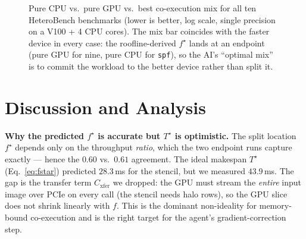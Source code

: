 \documentclass[conference]{IEEEtran}
\begin{document}
\begin{figure}[t]
\centering
{}
\caption{Pure CPU vs.\ pure GPU vs.\ best co-execution mix for all ten HeteroBench
benchmarks (lower is better, log scale, single precision on a V100 + 4 CPU cores). The
mix bar coincides with the faster device in every case: the roofline-derived $f^\star$
lands at an endpoint (pure GPU for nine, pure CPU for \texttt{spf}), so the AI's
``optimal mix'' is to commit the workload to the better device rather than split it.}
\label{fig:suite}
\end{figure}

\section{Discussion and Analysis}

\textbf{Why the predicted $f^\star$ is accurate but $T^\star$ is optimistic.}
The split location $f^\star$ depends only on the throughput \emph{ratio}, which the two
endpoint runs capture exactly --- hence the $0.60$ vs.\ $0.61$ agreement. The ideal
makespan $T^\star$ (Eq.~\ref{eq:fstar}) predicted $28.3$\,ms for the stencil, but we
measured $43.9$\,ms. The gap is the transfer term $C_\mathrm{xfer}$ we dropped: the GPU
must stream the \emph{entire} input image over PCIe on every call (the stencil needs halo
rows), so the GPU slice does not shrink linearly with $f$. This is the dominant
non-ideality for memory-bound co-execution and is the right target for the agent's
gradient-correction step.
\end{document}
